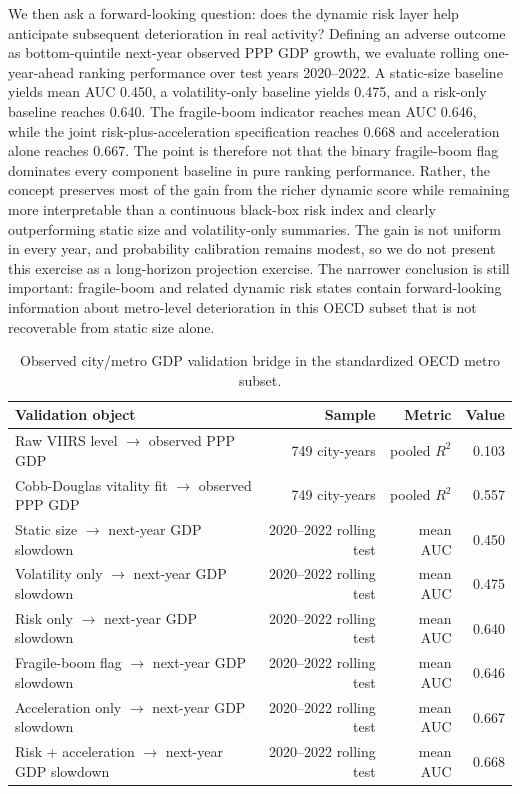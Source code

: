 \documentclass[11pt,a4paper]{article}
\begin{document}
We then ask a forward-looking question: does the dynamic risk layer help anticipate subsequent deterioration in real activity?
Defining an adverse outcome as bottom-quintile next-year observed PPP GDP growth, we evaluate rolling one-year-ahead ranking performance over test years 2020--2022.
A static-size baseline yields mean AUC 0.450, a volatility-only baseline yields 0.475, and a risk-only baseline reaches 0.640.
The fragile-boom indicator reaches mean AUC 0.646, while the joint risk-plus-acceleration specification reaches 0.668 and acceleration alone reaches 0.667.
The point is therefore not that the binary fragile-boom flag dominates every component baseline in pure ranking performance.
Rather, the concept preserves most of the gain from the richer dynamic score while remaining more interpretable than a continuous black-box risk index and clearly outperforming static size and volatility-only summaries.
The gain is not uniform in every year, and probability calibration remains modest, so we do not present this exercise as a long-horizon projection exercise.
The narrower conclusion is still important:
fragile-boom and related dynamic risk states contain forward-looking information about metro-level deterioration in this OECD subset that is not recoverable from static size alone.

\begin{table}[H]
\centering
\caption{Observed city/metro GDP validation bridge in the standardized OECD metro subset.}
\label{tab:gdp_validation_bridge}
\small
\setlength{\tabcolsep}{5pt}
\begin{tabular}{lrrr}
\toprule
Validation object & Sample & Metric & Value \\
\midrule
Raw VIIRS level $\rightarrow$ observed PPP GDP & 749 city-years & pooled $R^2$ & 0.103 \\
Cobb-Douglas vitality fit $\rightarrow$ observed PPP GDP & 749 city-years & pooled $R^2$ & 0.557 \\
Static size $\rightarrow$ next-year GDP slowdown & 2020--2022 rolling test & mean AUC & 0.450 \\
Volatility only $\rightarrow$ next-year GDP slowdown & 2020--2022 rolling test & mean AUC & 0.475 \\
Risk only $\rightarrow$ next-year GDP slowdown & 2020--2022 rolling test & mean AUC & 0.640 \\
Fragile-boom flag $\rightarrow$ next-year GDP slowdown & 2020--2022 rolling test & mean AUC & 0.646 \\
Acceleration only $\rightarrow$ next-year GDP slowdown & 2020--2022 rolling test & mean AUC & 0.667 \\
Risk + acceleration $\rightarrow$ next-year GDP slowdown & 2020--2022 rolling test & mean AUC & 0.668 \\
\bottomrule
\end{tabular}
\end{table}
\FloatBarrier
\end{document}
